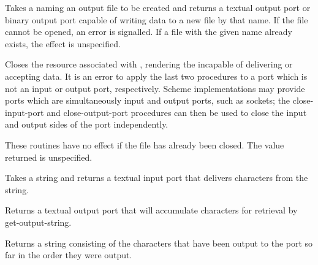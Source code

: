 \begin{entry}{%
}

Takes a  naming an output file to be created and returns a
textual output port or binary output port capable of writing
data to a new file by that name.  If the file cannot be opened,
an error is signalled.
If a file with the given name already exists,
the effect is unspecified.

\end{entry}


\begin{entry}{%
}

Closes the resource associated with , rendering the 
incapable of delivering or accepting data.  
It is an error
to apply the last two procedures to a port which is not an input
or output port, respectively.
Scheme implementations may provide ports which are simultaneously
input and output ports, such as sockets; the {\cf close-input-port}
and {\cf close-output-port} procedures can then be used to close the
input and output sides of the port independently.

These routines have no effect if the file has already been closed.
The value returned is unspecified.


\end{entry}

\begin{entry}{%
}

Takes a string and returns a textual input port that delivers
characters from the string.

\end{entry}

\begin{entry}{%
}

Returns a textual output port that will accumulate characters for
retrieval by {\cf get-output-string}.

\end{entry}

\begin{entry}{%
}

Returns a string consisting of the
characters that have been output to the port so far in the order they
were output.
\end{entry}



